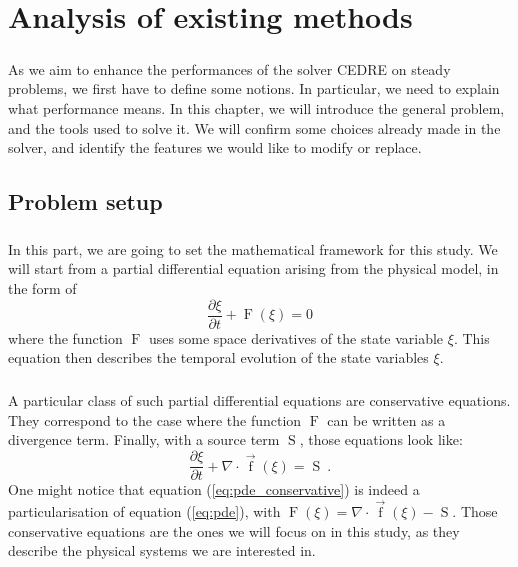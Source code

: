 \chapter{Analysis of existing methods}

  \paragraph{}
  As we aim to enhance the performances of the solver CEDRE on steady problems, we first have to define some notions.
  In particular, we need to explain what performance means.
  In this chapter, we will introduce the general problem, and the tools used to solve it.
  We will confirm some choices already made in the solver, and identify the features we would like to modify or replace.

  \section{Problem setup}

    \paragraph{}
    In this part, we are going to set the mathematical framework for this study.
    We will start from a partial differential equation arising from the physical model, in the form of
    \begin{equation}\label{eq:pde}
      \frac{\partial \xi}{\partial t} + \operatorname{F}\left(\xi\right) = 0
    \end{equation}
    where the function $\operatorname{F}$ uses some space derivatives of the state variable $\xi$.
    This equation then describes the temporal evolution of the state variables $\xi$.

    \paragraph{}
    A particular class of such partial differential equations are conservative equations.
    They correspond to the case where the function $\operatorname{F}$ can be written as a divergence term.
    Finally, with a source term $\operatorname{S}$, those equations look like:
    \begin{equation}\label{eq:pde_conservative}
      \frac{\partial \xi}{\partial t} + \nabla \cdot \vec{\operatorname{f}}\left(\xi\right) = \operatorname{S}\ .
    \end{equation}
    One might notice that equation (\ref{eq:pde_conservative}) is indeed a particularisation of equation (\ref{eq:pde}), with $\operatorname{F}\left(\xi\right) = \nabla\cdot \vec{\operatorname{f}}\left(\xi\right) - \operatorname{S}$.
    Those conservative equations are the ones we will focus on in this study, as they describe the physical systems we are interested in.

